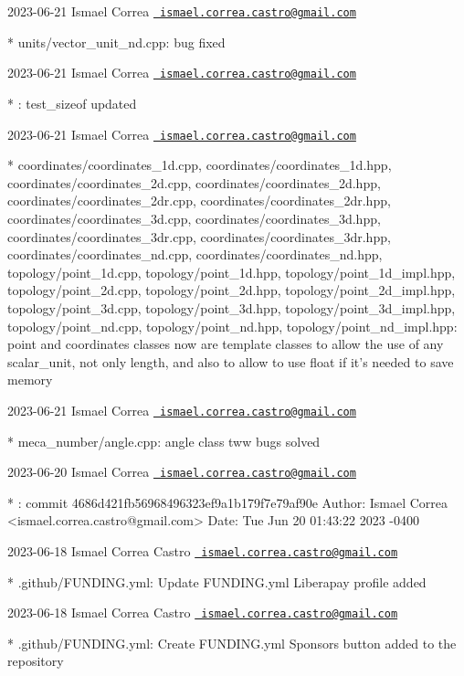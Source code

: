  2023-\/06-\/21 Ismael Correa \href{mailto:ismael.correa.castro@gmail.com}{\texttt{ ismael.\+correa.\+castro@gmail.\+com}} \begin{DoxyVerb}* units/vector_unit_nd.cpp: bug fixed
\end{DoxyVerb}
 2023-\/06-\/21 Ismael Correa \href{mailto:ismael.correa.castro@gmail.com}{\texttt{ ismael.\+correa.\+castro@gmail.\+com}} \begin{DoxyVerb}* : test_sizeof updated
\end{DoxyVerb}
 2023-\/06-\/21 Ismael Correa \href{mailto:ismael.correa.castro@gmail.com}{\texttt{ ismael.\+correa.\+castro@gmail.\+com}} \begin{DoxyVerb}* coordinates/coordinates_1d.cpp, coordinates/coordinates_1d.hpp,
coordinates/coordinates_2d.cpp, coordinates/coordinates_2d.hpp,
coordinates/coordinates_2dr.cpp, coordinates/coordinates_2dr.hpp,
coordinates/coordinates_3d.cpp, coordinates/coordinates_3d.hpp,
coordinates/coordinates_3dr.cpp, coordinates/coordinates_3dr.hpp,
coordinates/coordinates_nd.cpp, coordinates/coordinates_nd.hpp,
topology/point_1d.cpp, topology/point_1d.hpp,
topology/point_1d_impl.hpp, topology/point_2d.cpp,
topology/point_2d.hpp, topology/point_2d_impl.hpp,
topology/point_3d.cpp, topology/point_3d.hpp,
topology/point_3d_impl.hpp, topology/point_nd.cpp,
topology/point_nd.hpp, topology/point_nd_impl.hpp: point and
coordinates classes now are template classes to allow the use of any
scalar_unit, not only length, and also to allow to use float if it's
needed to save memory
\end{DoxyVerb}
 2023-\/06-\/21 Ismael Correa \href{mailto:ismael.correa.castro@gmail.com}{\texttt{ ismael.\+correa.\+castro@gmail.\+com}} \begin{DoxyVerb}* meca_number/angle.cpp: angle class tww bugs solved
\end{DoxyVerb}
 2023-\/06-\/20 Ismael Correa \href{mailto:ismael.correa.castro@gmail.com}{\texttt{ ismael.\+correa.\+castro@gmail.\+com}} \begin{DoxyVerb}* : commit 4686d421fb56968496323ef9a1b179f7e79af90e Author: Ismael
Correa <ismael.correa.castro@gmail.com> Date:   Tue Jun 20 01:43:22
2023 -0400
\end{DoxyVerb}
 2023-\/06-\/18 Ismael Correa Castro \href{mailto:ismael.correa.castro@gmail.com}{\texttt{ ismael.\+correa.\+castro@gmail.\+com}} \begin{DoxyVerb}* .github/FUNDING.yml: Update FUNDING.yml Liberapay profile added
\end{DoxyVerb}
 2023-\/06-\/18 Ismael Correa Castro \href{mailto:ismael.correa.castro@gmail.com}{\texttt{ ismael.\+correa.\+castro@gmail.\+com}} \begin{DoxyVerb}* .github/FUNDING.yml: Create FUNDING.yml Sponsors button added to the repository
\end{DoxyVerb}
